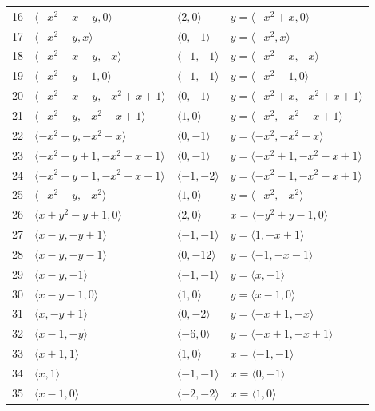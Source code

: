 \documentclass[11pt]{article}
\begin{document}
\begin{longtable}{@{}rlll@{}}
16 & $\langle -x^{2}+x-y,0\rangle$ & $\langle 2,0\rangle$ & $y=\langle -x^{2}+x,0\rangle$\\
17 & $\langle -x^{2}-y,x\rangle$ & $\langle 0,-1\rangle$ & $y=\langle -x^{2},x\rangle$\\
18 & $\langle -x^{2}-x-y,-x\rangle$ & $\langle -1,-1\rangle$ & $y=\langle -x^{2}-x,-x\rangle$\\
19 & $\langle -x^{2}-y-1,0\rangle$ & $\langle -1,-1\rangle$ & $y=\langle -x^{2}-1,0\rangle$\\
20 & $\langle -x^{2}+x-y,-x^{2}+x+1\rangle$ & $\langle 0,-1\rangle$ & $y=\langle -x^{2}+x,-x^{2}+x+1\rangle$\\
21 & $\langle -x^{2}-y,-x^{2}+x+1\rangle$ & $\langle 1,0\rangle$ & $y=\langle -x^{2},-x^{2}+x+1\rangle$\\
22 & $\langle -x^{2}-y,-x^{2}+x\rangle$ & $\langle 0,-1\rangle$ & $y=\langle -x^{2},-x^{2}+x\rangle$\\
23 & $\langle -x^{2}-y+1,-x^{2}-x+1\rangle$ & $\langle 0,-1\rangle$ & $y=\langle -x^{2}+1,-x^{2}-x+1\rangle$\\
24 & $\langle -x^{2}-y-1,-x^{2}-x+1\rangle$ & $\langle -1,-2\rangle$ & $y=\langle -x^{2}-1,-x^{2}-x+1\rangle$\\
25 & $\langle -x^{2}-y,-x^{2}\rangle$ & $\langle 1,0\rangle$ & $y=\langle -x^{2},-x^{2}\rangle$\\
26 & $\langle x+y^{2}-y+1,0\rangle$ & $\langle 2,0\rangle$ & $x=\langle -y^{2}+y-1,0\rangle$\\
27 & $\langle x-y,-y+1\rangle$ & $\langle -1,-1\rangle$ & $y=\langle 1,-x+1\rangle$\\
28 & $\langle x-y,-y-1\rangle$ & $\langle 0,-12\rangle$ & $y=\langle -1,-x-1\rangle$\\
29 & $\langle x-y,-1\rangle$ & $\langle -1,-1\rangle$ & $y=\langle x,-1\rangle$\\
30 & $\langle x-y-1,0\rangle$ & $\langle 1,0\rangle$ & $y=\langle x-1,0\rangle$\\
31 & $\langle x,-y+1\rangle$ & $\langle 0,-2\rangle$ & $y=\langle -x+1,-x\rangle$\\
32 & $\langle x-1,-y\rangle$ & $\langle -6,0\rangle$ & $y=\langle -x+1,-x+1\rangle$\\
33 & $\langle x+1,1\rangle$ & $\langle 1,0\rangle$ & $x=\langle -1,-1\rangle$\\
34 & $\langle x,1\rangle$ & $\langle -1,-1\rangle$ & $x=\langle 0,-1\rangle$\\
35 & $\langle x-1,0\rangle$ & $\langle -2,-2\rangle$ & $x=\langle 1,0\rangle$\\

\end{longtable}
\end{document}

